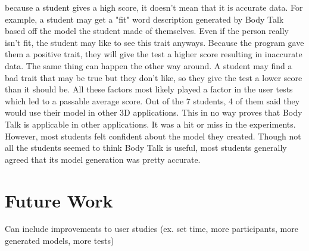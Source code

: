 \documentclass[journal]{vgtc}                %
\begin{document}
because a student gives 
a high score, it doesn't mean that it is accurate data. For example, a student may get a "fit" word description generated by Body Talk 
based off the 
model the student made of themselves. Even if the person really isn't fit, the student may like to see this trait anyways. Because the 
program gave them 
a positive trait, they will give the test a higher score resulting in inaccurate data. The same thing can happen the other way around. A 
student may find 
a bad trait that may be true but they don't like, so they give the test a lower score than it should be. All these factors most likely 
played a factor in 
the user tests which led to a passable average score. Out of the 7 students, 4 of them said they would use their model in other 3D 
applications. This in no way proves that Body Talk is applicable in other applications. It was a hit or miss in the experiments. 
However, most students felt confident about the model they created. Though not all the students seemed to think Body Talk is useful, 
most students generally agreed that its model generation was pretty accurate. \newline

\noindent       

\section{Future Work}

Can include improvements to user studies (ex. set time, more participants, more generated models, more tests) 
\end{document}
